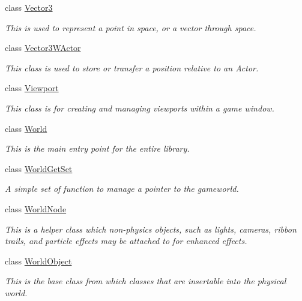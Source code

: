 \begin{DoxyCompactItemize}
class \hyperlink{classMezzanine_1_1Vector3}{Vector3}
\begin{DoxyCompactList}\small\item\em This is used to represent a point in space, or a vector through space. \item\end{DoxyCompactList}\item 
class \hyperlink{classMezzanine_1_1Vector3WActor}{Vector3WActor}
\begin{DoxyCompactList}\small\item\em This class is used to store or transfer a position relative to an Actor. \item\end{DoxyCompactList}\item 
class \hyperlink{classMezzanine_1_1Viewport}{Viewport}
\begin{DoxyCompactList}\small\item\em This class is for creating and managing viewports within a game window. \item\end{DoxyCompactList}\item 
class \hyperlink{classMezzanine_1_1World}{World}
\begin{DoxyCompactList}\small\item\em This is the main entry point for the entire library. \item\end{DoxyCompactList}\item 
class \hyperlink{classMezzanine_1_1WorldGetSet}{WorldGetSet}
\begin{DoxyCompactList}\small\item\em A simple set of function to manage a pointer to the gameworld. \item\end{DoxyCompactList}\item 
class \hyperlink{classMezzanine_1_1WorldNode}{WorldNode}
\begin{DoxyCompactList}\small\item\em This is a helper class which non-\/physics objects, such as lights, cameras, ribbon trails, and particle effects may be attached to for enhanced effects. \item\end{DoxyCompactList}\item 
class \hyperlink{classMezzanine_1_1WorldObject}{WorldObject}
\begin{DoxyCompactList}\small\item\em This is the base class from which classes that are insertable into the physical world. \item\end{DoxyCompactList}\item 

\end{DoxyCompactItemize}
